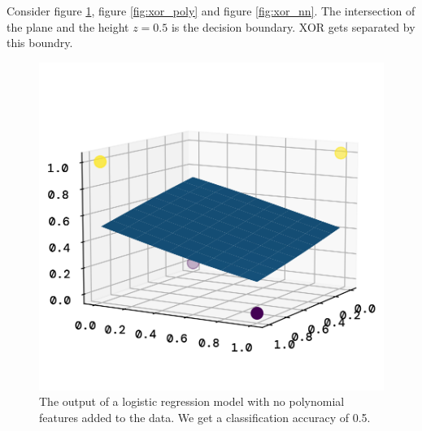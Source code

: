 \documentclass[twoside,11pt]{report}
\begin{document}
    \noindent
    Consider figure \ref{fig:xor_plain}, figure \ref{fig:xor_poly} and figure \ref{fig:xor_nn}.
    The intersection of the plane and the height $z=0.5$ is the decision boundary.
    XOR gets separated by this boundry. 
    \begin{figure}[h]
        \begin{minipage}{0.5\textwidth - 1mm}
            \begin{center}
                \includegraphics[width=\textwidth]{../runsAndFigures/xor_plain.png}
                \caption{
                The output of a logistic regression model with no polynomial features added to the data.
                    We get a classification accuracy of 0.5.
                }\label{fig:xor_plain}
            \end{center}
        \end{minipage}
        \hspace{2mm}
        \begin{minipage}{0.5\textwidth - 1mm}
            \begin{center}

\end{center}
\end{minipage}
\end{figure}
\end{document}
